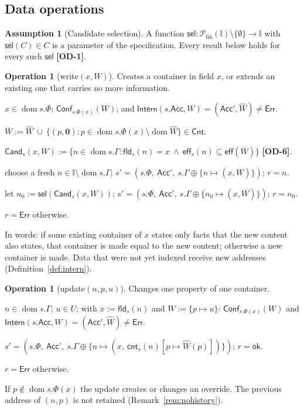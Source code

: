 \documentclass[11pt,a4paper]{article}
\theoremstyle{definition}
\newtheorem{assumption}[definition]{Assumption}
\newtheorem{operation}[definition]{Operation}
\theoremstyle{plain}
\theoremstyle{remark}
\newcommand{\od}[1]{\textsf{\textbf{\textcolor{BrickRed}{[OD-#1]}}}}
\newcommand{\Idn}{\mathbb{I}}
\newcommand{\Cnt}{\mathsf{Cnt}}
\newcommand{\nul}{\mathbf{0}}
\newcommand{\Err}{\mathsf{Err}}
\newcommand{\ok}{\mathsf{ok}}
\newcommand{\dom}{\operatorname{dom}}
\newcommand{\eff}{\mathsf{eff}}
\newcommand{\fld}{\mathsf{fld}}
\newcommand{\cnt}{\mathsf{cnt}}
\newcommand{\Acc}{\mathsf{Acc}}
\newcommand{\Intern}{\mathsf{Intern}}
\newcommand{\Cand}{\mathsf{Cand}}
\newcommand{\sel}{\mathsf{sel}}
\newcommand{\Pfin}{\mathcal{P}_{\mathrm{fin}}}
\begin{document}
\subsection{Data operations}

\begin{assumption}[Candidate selection]\label{ass:sel}
A function $\sel:\Pfin(\Idn)\setminus\{\emptyset\}\to\Idn$ with $\sel(C)\in C$ is a parameter of the specification.
Every result below holds for every such $\sel$ \od{1}.
\end{assumption}

\begin{operation}[\textsf{write}$(x,W)$]\label{op:write}
Creates a container in field $x$, or extends an existing one that carries no more information.
\begin{description}[leftmargin=2.2cm,labelwidth=2cm,font=\bfseries]
\item[Precondition] $x\in\dom s.\Phi$; $\mathsf{Conf}_{s.\Phi(x)}(W)$; and $\Intern(s.\Acc,W)=(\Acc',\widehat W)\neq\Err$.
\item[Padding] $\overline W:=\widehat W\ \cup\ \{(p,\nul) : p\in\dom s.\Phi(x)\setminus\dom\widehat W\}\in\Cnt$.
\item[Candidates] $\Cand_s(x,W):=\{n\in\dom s.\Gamma : \fld_s(n)=x\ \wedge\ \eff_s(n)\subseteq\eff(\overline W)\}$ \od{6}.
\item[Effect, $\Cand=\emptyset$] choose a fresh $n\in\Idn\setminus\dom s.\Gamma$; $s'=(s.\Phi,\ \Acc',\ s.\Gamma\oplus\{n\mapsto(x,\overline W)\})$; $r=n$.
\item[Effect, $\Cand\neq\emptyset$] let $n_0:=\sel(\Cand_s(x,W))$; $s'=(s.\Phi,\ \Acc',\ s.\Gamma\oplus\{n_0\mapsto(x,\overline W)\})$; $r=n_0$.
\item[Failure] $r=\Err$ otherwise.
\end{description}
In words: if some existing container of $x$ states only facts that the new content also states, that container is made equal to the new content;
otherwise a new container is made. Data that were not yet indexed receive new addresses (Definition~\ref{def:intern}).
\end{operation}

\begin{operation}[\textsf{update}$(n,p,u)$]\label{op:update}
Changes one property of one container.
\begin{description}[leftmargin=2.2cm,labelwidth=2cm,font=\bfseries]
\item[Precondition] $n\in\dom s.\Gamma$; $u\in U$; with $x:=\fld_s(n)$ and $W:=\{p\mapsto u\}$: $\mathsf{Conf}_{s.\Phi(x)}(W)$ and $\Intern(s.\Acc,W)=(\Acc',\widehat W)\neq\Err$.
\item[Effect] $s'=(s.\Phi,\ \Acc',\ s.\Gamma\oplus\{n\mapsto(x,\ \cnt_s(n)[p\mapsto\widehat W(p)])\})$; $r=\ok$.
\item[Failure] $r=\Err$ otherwise.
\end{description}
If $p\notin\dom s.\Phi(x)$ the update creates or changes an override. The previous address of $(n,p)$ is not retained (Remark~\ref{rem:nohistory}).
\end{operation}
\end{document}
